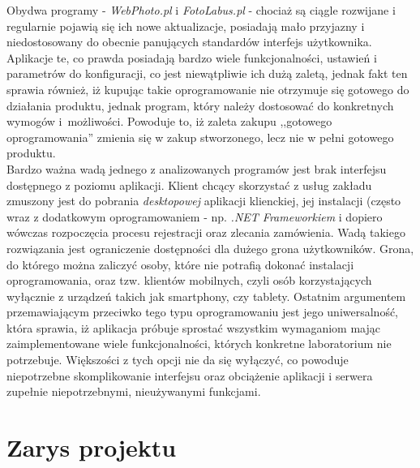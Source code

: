 Obydwa programy - \textit{WebPhoto.pl} i \textit{FotoLabus.pl} - chociaż są ciągle rozwijane i regularnie pojawią się ich nowe aktualizacje, posiadają mało przyjazny i niedostosowany do obecnie panujących standardów interfejs użytkownika. Aplikacje te, co prawda posiadają bardzo wiele funkcjonalności, ustawień i parametrów do konfiguracji, co jest niewątpliwie ich dużą zaletą, jednak fakt ten sprawia również, iż kupując takie oprogramowanie nie otrzymuje się gotowego do działania produktu, jednak program, który należy dostosować do konkretnych wymogów i~możliwości. Powoduje to, iż zaleta zakupu ,,gotowego oprogramowania'' zmienia się w zakup stworzonego, lecz nie w pełni gotowego produktu. \\
Bardzo ważna wadą jednego z analizowanych programów jest brak interfejsu dostępnego z poziomu aplikacji. Klient chcący skorzystać z usług zakładu zmuszony jest do pobrania \textit{desktopowej} aplikacji klienckiej, jej instalacji (często wraz z dodatkowym oprogramowaniem - np. \textit{.NET Frameworkiem} i dopiero wówczas rozpoczęcia procesu rejestracji oraz zlecania zamówienia. Wadą takiego rozwiązania jest ograniczenie dostępności dla dużego grona użytkowników. Grona, do którego można zaliczyć osoby, które nie potrafią dokonać instalacji oprogramowania, oraz tzw. klientów mobilnych, czyli osób korzystających wyłącznie z urządzeń takich jak smartphony, czy tablety. Ostatnim argumentem przemawiającym przeciwko tego typu oprogramowaniu jest jego uniwersalność, która sprawia, iż aplikacja próbuje sprostać wszystkim wymaganiom mając zaimplementowane wiele funkcjonalności, których konkretne laboratorium nie potrzebuje. Większości z tych opcji nie da się wyłączyć, co powoduje niepotrzebne skomplikowanie interfejsu oraz obciążenie aplikacji i serwera zupełnie niepotrzebnymi, nieużywanymi funkcjami.


\section{Zarys projektu}

